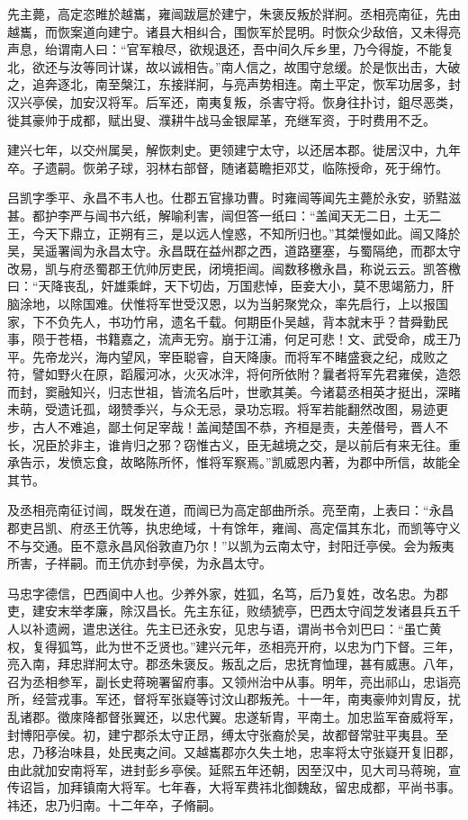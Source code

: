 \documentclass[12pt,UTF8]{ctexbook}
\begin{document}
先主薨，高定恣睢於越巂，雍闿跋扈於建宁，朱褒反叛於牂牁。丞相亮南征，先由越巂，而恢案道向建宁。诸县大相纠合，围恢军於昆明。时恢众少敌倍，又未得亮声息，绐谓南人曰：“官军粮尽，欲规退还，吾中间久斥乡里，乃今得旋，不能复北，欲还与汝等同计谋，故以诚相告。”南人信之，故围守怠缓。於是恢出击，大破之，追奔逐北，南至槃江，东接牂牁，与亮声势相连。南土平定，恢军功居多，封汉兴亭侯，加安汉将军。后军还，南夷复叛，杀害守将。恢身往扑讨，鉏尽恶类，徙其豪帅于成都，赋出叟、濮耕牛战马金银犀革，充继军资，于时费用不乏。

建兴七年，以交州属吴，解恢刺史。更领建宁太守，以还居本郡。徙居汉中，九年卒。子遗嗣。恢弟子球，羽林右部督，随诸葛瞻拒邓艾，临陈授命，死于绵竹。

吕凯字季平、永昌不韦人也。仕郡五官掾功曹。时雍闿等闻先主薨於永安，骄黠滋甚。都护李严与闿书六纸，解喻利害，闿但答一纸曰：“盖闻天无二日，土无二王，今天下鼎立，正朔有三，是以远人惶惑，不知所归也。”其桀慢如此。闿又降於吴，吴遥署闿为永昌太守。永昌既在益州郡之西，道路壅塞，与蜀隔绝，而郡太守改易，凯与府丞蜀郡王伉帅厉吏民，闭境拒闿。闿数移檄永昌，称说云云。凯答檄曰：“天降丧乱，奸雄乘衅，天下切齿，万国悲悼，臣妾大小，莫不思竭筋力，肝脑涂地，以除国难。伏惟将军世受汉恩，以为当躬聚党众，率先启行，上以报国家，下不负先人，书功竹帛，遗名千载。何期臣仆吴越，背本就末乎？昔舜勤民事，陨于苍梧，书籍嘉之，流声无穷。崩于江浦，何足可悲！文、武受命，成王乃平。先帝龙兴，海内望风，宰臣聪睿，自天降康。而将军不睹盛衰之纪，成败之符，譬如野火在原，蹈履河冰，火灭冰泮，将何所依附？曩者将军先君雍侯，造怨而封，窦融知兴，归志世祖，皆流名后叶，世歌其美。今诸葛丞相英才挺出，深睹未萌，受遗讬孤，翊赞季兴，与众无忌，录功忘瑕。将军若能翻然改图，易迹更步，古人不难追，鄙土何足宰哉！盖闻楚国不恭，齐桓是责，夫差僣号，晋人不长，况臣於非主，谁肯归之邪？窃惟古义，臣无越境之交，是以前后有来无往。重承告示，发愤忘食，故略陈所怀，惟将军察焉。”凯威恩内著，为郡中所信，故能全其节。

及丞相亮南征讨闿，既发在道，而闿已为高定部曲所杀。亮至南，上表曰：“永昌郡吏吕凯、府丞王伉等，执忠绝域，十有馀年，雍闿、高定偪其东北，而凯等守义不与交通。臣不意永昌风俗敦直乃尔！”以凯为云南太守，封阳迁亭侯。会为叛夷所害，子祥嗣。而王伉亦封亭侯，为永昌太守。

马忠字德信，巴西阆中人也。少养外家，姓狐，名笃，后乃复姓，改名忠。为郡吏，建安末举孝廉，除汉昌长。先主东征，败绩猇亭，巴西太守阎芝发诸县兵五千人以补遗阙，遣忠送往。先主已还永安，见忠与语，谓尚书令刘巴曰：“虽亡黄权，复得狐笃，此为世不乏贤也。”建兴元年，丞相亮开府，以忠为门下督。三年，亮入南，拜忠牂牁太守。郡丞朱褒反。叛乱之后，忠抚育恤理，甚有威惠。八年，召为丞相参军，副长史蒋琬署留府事。又领州治中从事。明年，亮出祁山，忠诣亮所，经营戎事。军还，督将军张嶷等讨汶山郡叛羌。十一年，南夷豪帅刘胄反，扰乱诸郡。徵庲降都督张翼还，以忠代翼。忠遂斩胄，平南土。加忠监军奋威将军，封博阳亭侯。初，建宁郡杀太守正昂，缚太守张裔於吴，故都督常驻平夷县。至忠，乃移治味县，处民夷之间。又越巂郡亦久失土地，忠率将太守张嶷开复旧郡，由此就加安南将军，进封彭乡亭侯。延熙五年还朝，因至汉中，见大司马蒋琬，宣传诏旨，加拜镇南大将军。七年春，大将军费祎北御魏敌，留忠成都，平尚书事。祎还，忠乃归南。十二年卒，子脩嗣。
\end{document}
